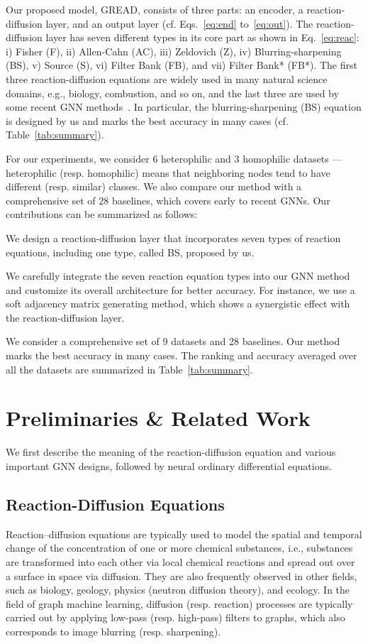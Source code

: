 \documentclass{article}
\theoremstyle{plain}
\theoremstyle{definition}
\theoremstyle{remark}
\begin{document}
Our proposed model, GREAD, consists of three parts: an encoder, a reaction-diffusion layer, and an output layer (cf. Eqs.~\eqref{eq:end} to~\eqref{eq:out}). The reaction-diffusion layer has seven different types in its core part as shown in Eq.~\eqref{eq:reac}: i) Fisher (F), ii) Allen-Cahn (AC), iii) Zeldovich (Z), iv) Blurring-sharpening (BS), v) Source (S), vi) Filter Bank (FB), and vii) Filter Bank* (FB*). The first three reaction-diffusion equations are widely used in many natural science domains, e.g., biology, combustion, and so on, and the last three are used by some recent GNN methods~\cite{xhonneux2019CGNN,thorpe2022grands,luan2022ACMGCN}. In particular, the blurring-sharpening (BS) equation is designed by us and marks the best accuracy in many cases (cf. Table~\ref{tab:summary}).


For our experiments, we consider 6 heterophilic and 3 homophilic datasets --- heterophilic (resp. homophilic) means that neighboring nodes tend to have different (resp. similar) classes. We also compare our method with a comprehensive set of 28 baselines, which covers early to recent GNNs. Our contributions can be summarized as follows:
\begin{compactenum}
    \item We design a reaction-diffusion layer that incorporates seven types of reaction equations, including one type, called BS, proposed by us.
    \item We carefully integrate the seven reaction equation types into our GNN method and customize its overall architecture for better accuracy. For instance, we use a soft adjacency matrix generating method, which shows a synergistic effect with the reaction-diffusion layer.
    \item We consider a comprehensive set of 9 datasets and 28 baselines. Our method marks the best accuracy in many cases. The ranking and accuracy averaged over all the datasets are summarized in Table~\ref{tab:summary}.
\end{compactenum}

\section{Preliminaries \& Related Work}
We first describe the meaning of the reaction-diffusion equation and various important GNN designs, followed by neural ordinary differential equations.

\subsection{Reaction-Diffusion Equations}
Reaction–diffusion equations are typically used to model the spatial and temporal change of the concentration of one or more chemical substances, i.e., substances are transformed into each other via local chemical reactions and spread out over a surface in space via diffusion. They are also frequently observed in other fields, such as biology, geology, physics (neutron diffusion theory), and ecology. In the field of graph machine learning, diffusion (resp. reaction) processes are typically carried out by applying low-pass (resp. high-pass) filters to graphs, which also corresponds to image blurring (resp. sharpening).
\end{document}
